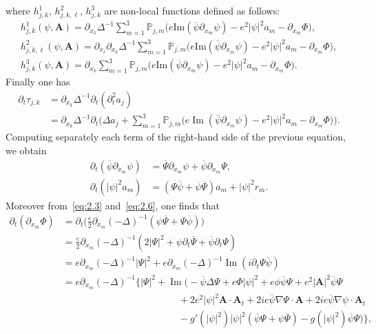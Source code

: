 \documentclass[10pt]{amsart}
\theoremstyle{definition}\newtheorem{defi}[theo]{Definition}\newtheorem{rema}[theo]{Remark}\newtheorem{exam}[theo]{Example}\newtheorem{exem}[theo]{Example}\newtheorem{nota}[theo]{Notation}
\newcommand{\BA}{\mathbf{A}}
\DeclareMathOperator{\IM}{Im}
\begin{document}
where $h^1_{j,k}$, $h_{j,k,\ell}^2$, $h^3_{j,k}$ are non-local functions defined as follows:
\begin{gather*}
h^1_{j,k}(\psi,\BA) =\partial_{x_k} \Delta^{-1}\sum_{m=1}^3 {\mathbb P}_{j,m}
\big(e\text{Im}(\overline{\psi}\partial_{x_m} \psi)-e^2|\psi|^2a_m -\partial_{x_m} \Phi \big),
\\
h^2_{j,k,\ell}(\psi,\BA) =\partial_{x_\ell} \partial_{x_k} \Delta^{-1}\sum_{m=1}^3{\mathbb P}_{j,m}
\big(e\text{Im}(\overline{\psi}\partial_{x_m} \psi)-e^2|\psi|^2a_m -\partial_{x_m} \Phi \big),
\\
h^3_{j,k}(\psi,\BA) =\partial_{x_k} \sum_{m=1}^3{\mathbb P}_{j,m}
\big(e\text{Im}(\overline{\psi}\partial_{x_m} \psi)-e^2|\psi|^2a_m -\partial_{x_m} \Phi \big).
\end{gather*}
Finally one has
\begin{align*}
\partial_t \tau_{j,k} &= \partial_{x_k} \Delta^{-1} \partial_t (\partial_t^2 a_j) \\
&= \partial_{x_k} \Delta^{-1} \partial_t
\Big(\Delta a_j + \sum_{m=1}^3 {\mathbb P}_{j,m}
\Big(e \IM (\bar{\psi} \partial_{x_m} \psi)-e^2|\psi|^2 a_m -\partial_{x_m} \Phi \Big) \Big).
\end{align*}
Computing separately each term of the right-hand side of the previous equation, we obtain
\begin{align*}
\partial_t(\overline{\psi}\partial_{x_m} \psi) &=\overline{\Psi}\partial_{x_m}\psi + \overline{\psi}\partial_{x_m} \Psi, \\
\partial_t(|\psi|^2a_m)&= (\Psi \overline{\psi}+\psi \overline{\Psi}) a_m + |\psi|^2 r_m.
\end{align*}
Moreover from~\eqref{eq:2.3} and~\eqref{eq:2.6}, one finds that
\begin{align*}
\partial_t (\partial_{x_m} \Phi) &= \partial_t \Big(\frac{e}{2} \partial_{x_m} (-\Delta)^{-1} (\psi \overline{\Psi} + \Psi \overline{\psi}) \Big) \\
&= \frac{e}{2} \partial_{x_m} (-\Delta)^{-1} (2|\Psi|^2+\psi \partial_t \overline{\Psi} +\overline{\psi} \partial_t \Psi) \\
&= e \partial_{x_m} (-\Delta)^{-1} |\Psi|^2 +e \partial_{x_m} (-\Delta)^{-1} \IM (i \partial_t \Psi \overline{\psi}) \\
&= e \partial_{x_m} (-\Delta)^{-1} \Big\{ |\Psi|^2 + \IM \Big(-\overline{\psi} \Delta \Psi +e \Phi |\psi|^2 +e \phi \overline{\psi} \Psi +e^2 |\BA|^2 \overline{\psi} \Psi \\
&\hspace{12em} + 2e^2 |\psi|^2 \BA \cdot \BA_t +2i e \overline{\psi} \nabla \Psi \cdot \BA +2i e \overline{\psi} \nabla \psi \cdot \BA_t \\
&\hspace{12em} -g'(|\psi|^2)|\psi|^2(\overline{\psi}\Psi+\psi\overline{\Psi}) - g(|\psi|^2) \overline{\psi} \Psi \Big) \Big\},
\end{align*}
\end{document}
